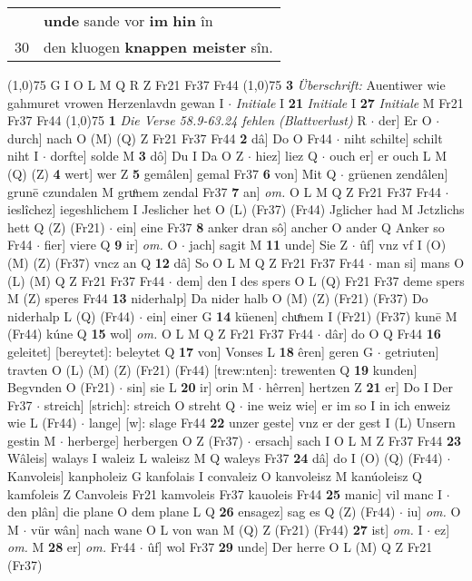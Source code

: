 \documentclass[8pt,a4paper,notitlepage]{article}
\begin{document}
\begin{table}[ht]
\begin{minipage}[t]{0.5\linewidth}
\begin{tabular}{rl}
 & \textbf{unde} sande vor \textbf{im} \textbf{hin} în\\ 
30 & den kluogen \textbf{knappen meister} sîn.\\ 
\end{tabular}
\scriptsize
\line(1,0){75} \newline
G I O L M Q R Z Fr21 Fr37 Fr44 \newline
\line(1,0){75} \newline
\textbf{3} \textit{Überschrift:} Auentiwer wie gahmuret vrowen Herzenlavdn gewan I   $\cdot$ \textit{Initiale} I  \textbf{21} \textit{Initiale} I  \textbf{27} \textit{Initiale} M Fr21 Fr37 Fr44  \newline
\line(1,0){75} \newline
\textbf{1} \textit{Die Verse 58.9-63.24 fehlen (Blattverlust)} R   $\cdot$ der] Er O  $\cdot$ durch] nach O (M) (Q) Z Fr21 Fr37 Fr44 \textbf{2} dâ] Do O Fr44  $\cdot$ niht schilte] schilt niht I  $\cdot$ dorfte] solde M \textbf{3} dô] Du I Da O Z  $\cdot$ hiez] liez Q  $\cdot$ ouch er] er ouch L M (Q) (Z) \textbf{4} wert] wer Z \textbf{5} gemâlen] gemal Fr37 \textbf{6} von] Mit Q  $\cdot$ grüenen zendâlen] grunē czundalen M gruͦnem zendal Fr37 \textbf{7} an] \textit{om.} O L M Q Z Fr21 Fr37 Fr44  $\cdot$ ieslîchez] iegeshlichem I Jeslicher het O (L) (Fr37) (Fr44) Jglicher had M Jctzlichs hett Q (Z) (Fr21)  $\cdot$ ein] eine Fr37 \textbf{8} anker dran sô] ancher O ander Q Anker so Fr44  $\cdot$ fier] viere Q \textbf{9} ir] \textit{om.} O  $\cdot$ jach] sagit M \textbf{11} unde] Sie Z  $\cdot$ ûf] vnz vf I (O) (M) (Z) (Fr37) vncz an Q \textbf{12} dâ] So O L M Q Z Fr21 Fr37 Fr44  $\cdot$ man si] mans O (L) (M) Q Z Fr21 Fr37 Fr44  $\cdot$ dem] den I des spers O L (Q) Fr21 Fr37 deme spers M (Z) speres Fr44 \textbf{13} niderhalp] Da nider halb O (M) (Z) (Fr21) (Fr37) Do niderhalp L (Q) (Fr44)  $\cdot$ ein] einer G \textbf{14} küenen] chuͤnem I (Fr21) (Fr37) kunē M (Fr44) kúne Q \textbf{15} wol] \textit{om.} O L M Q Z Fr21 Fr37 Fr44  $\cdot$ dâr] do O Q Fr44 \textbf{16} geleitet] [bereytet]: beleytet Q \textbf{17} von] Vonses L \textbf{18} êren] geren G  $\cdot$ getriuten] travten O (L) (M) (Z) (Fr21) (Fr44) [trew:nten]: trewenten  Q \textbf{19} kunden] Begvnden O (Fr21)  $\cdot$ sin] sie L \textbf{20} ir] orin M  $\cdot$ hêrren] hertzen Z \textbf{21} er] Do I Der Fr37  $\cdot$ streich] [strich]: streich O streht Q  $\cdot$ ine weiz wie] er im so I in ich enweiz wie L (Fr44)  $\cdot$ lange] [w]: slage Fr44 \textbf{22} unzer geste] vnz er der gest I (L) Unsern gestin M  $\cdot$ herberge] herbergen O Z (Fr37)  $\cdot$ ersach] sach I O L M Z Fr37 Fr44 \textbf{23} Wâleis] walays I waleiz L waleisz M Q waleys Fr37 \textbf{24} dâ] do I (O) (Q) (Fr44)  $\cdot$ Kanvoleis] kanpholeiz G kanfolais I convaleiz O kanvoleisz M kanúoleisz Q kamfoleis Z Canvoleis Fr21 kamvoleis Fr37 kauoleis Fr44 \textbf{25} manic] vil manc I  $\cdot$ den plân] die plane O dem plane L Q \textbf{26} ensagez] sag es Q (Z) (Fr44)  $\cdot$ iu] \textit{om.} O M  $\cdot$ vür wân] nach wane O L von wan M (Q) Z (Fr21) (Fr44) \textbf{27} ist] \textit{om.} I  $\cdot$ ez] \textit{om.} M \textbf{28} er] \textit{om.} Fr44  $\cdot$ ûf] wol Fr37 \textbf{29} unde] Der herre O L (M) Q Z Fr21 (Fr37) 
\end{minipage}
\end{table}
\end{document}
